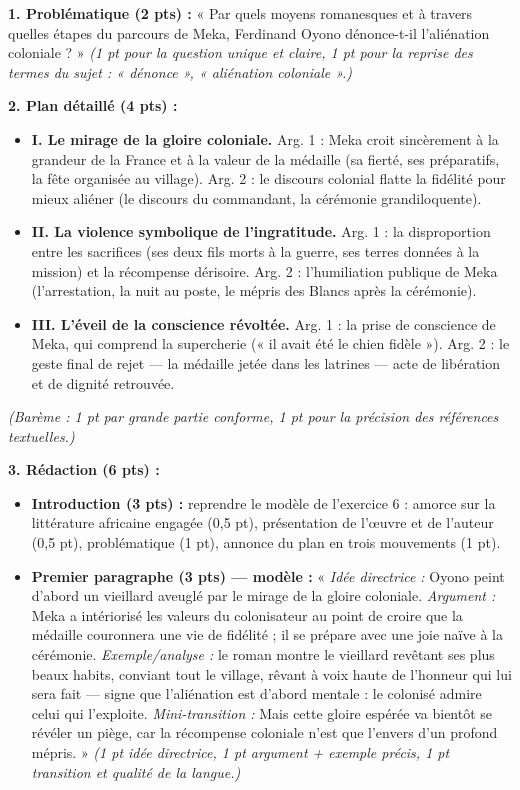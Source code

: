 \documentclass[11pt]{article}
\begin{document}
\begin{corrige}
\textbf{1. Problématique (2 pts) :} « Par quels moyens romanesques et à travers quelles étapes du parcours de Meka, Ferdinand Oyono dénonce-t-il l'aliénation coloniale ? » \emph{(1 pt pour la question unique et claire, 1 pt pour la reprise des termes du sujet : « dénonce », « aliénation coloniale ».)}

\textbf{2. Plan détaillé (4 pts) :}
\begin{itemize}
\item \textbf{I. Le mirage de la gloire coloniale.} Arg. 1 : Meka croit sincèrement à la grandeur de la France et à la valeur de la médaille (sa fierté, ses préparatifs, la fête organisée au village). Arg. 2 : le discours colonial flatte la fidélité pour mieux aliéner (le discours du commandant, la cérémonie grandiloquente).
\item \textbf{II. La violence symbolique de l'ingratitude.} Arg. 1 : la disproportion entre les sacrifices (ses deux fils morts à la guerre, ses terres données à la mission) et la récompense dérisoire. Arg. 2 : l'humiliation publique de Meka (l'arrestation, la nuit au poste, le mépris des Blancs après la cérémonie).
\item \textbf{III. L'éveil de la conscience révoltée.} Arg. 1 : la prise de conscience de Meka, qui comprend la supercherie (« il avait été le chien fidèle »). Arg. 2 : le geste final de rejet — la médaille jetée dans les latrines — acte de libération et de dignité retrouvée.
\end{itemize}
\emph{(Barème : 1 pt par grande partie conforme, 1 pt pour la précision des références textuelles.)}

\textbf{3. Rédaction (6 pts) :}
\begin{itemize}
\item[a)] \textbf{Introduction (3 pts) :} reprendre le modèle de l'exercice 6 : amorce sur la littérature africaine engagée (0,5 pt), présentation de l'œuvre et de l'auteur (0,5 pt), problématique (1 pt), annonce du plan en trois mouvements (1 pt).
\item[b)] \textbf{Premier paragraphe (3 pts) — modèle :} « \emph{Idée directrice :} Oyono peint d'abord un vieillard aveuglé par le mirage de la gloire coloniale. \emph{Argument :} Meka a intériorisé les valeurs du colonisateur au point de croire que la médaille couronnera une vie de fidélité ; il se prépare avec une joie naïve à la cérémonie. \emph{Exemple/analyse :} le roman montre le vieillard revêtant ses plus beaux habits, conviant tout le village, rêvant à voix haute de l'honneur qui lui sera fait — signe que l'aliénation est d'abord mentale : le colonisé admire celui qui l'exploite. \emph{Mini-transition :} Mais cette gloire espérée va bientôt se révéler un piège, car la récompense coloniale n'est que l'envers d'un profond mépris. » \emph{(1 pt idée directrice, 1 pt argument + exemple précis, 1 pt transition et qualité de la langue.)}
\end{itemize}
\end{corrige}
\end{document}
